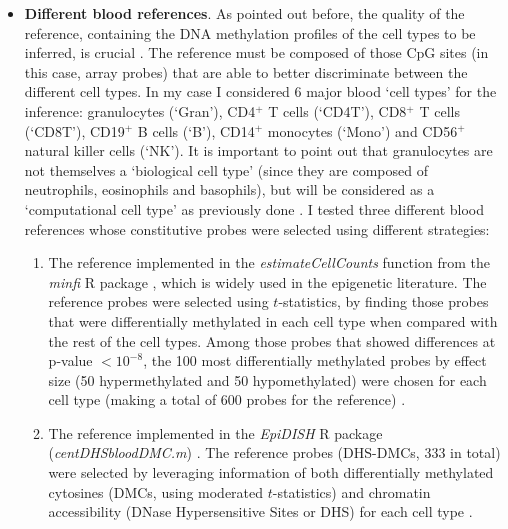 \begin{itemize}
	
	\item \textbf{Different blood references}. As pointed out before, the quality of the reference, containing the DNA methylation profiles of the cell types to be inferred, is crucial \cite{Teschendorff2017a,Koestler2016}. The reference must be composed of those CpG sites (in this case, array probes) that are able to better discriminate between the different cell types. In my case I considered 6 major blood `cell types' for the inference: granulocytes (`\acrshort{Gran}'), CD4$^+$ T cells (`\acrshort{CD4T}'), CD8$^+$ T cells (`\acrshort{CD8T}'), CD19$^+$ B cells (`\acrshort{B}'), CD14$^+$ monocytes (`\acrshort{Mono}') and  CD56$^+$ natural killer cells (`\acrshort{NK}'). It is important to point out that granulocytes are not themselves a `biological cell type' (since they are composed of neutrophils, eosinophils and basophils), but will be considered as a `computational cell type' as previously done \cite{Horvath2016, Chen2016}. I tested three different blood references whose constitutive probes were selected using different strategies:
	
	\begin{enumerate}
		
		\item The reference implemented in the \textit{estimateCellCounts} function from the \textit{minfi} R package \cite{Aryee2014}, which is widely used in the epigenetic literature. The reference probes were selected using $t$-statistics, by finding those probes that were differentially methylated in each cell type when compared with the rest of the cell types. Among those probes that showed differences at p-value $< 10^{-8}$, the 100 most differentially methylated probes by effect size (50 hypermethylated and 50 hypomethylated) were chosen for each cell type (making a total of 600 probes for the reference) \cite{Jaffe2014}. 
		
		\smallskip
		
		\item The reference implemented in the \textit{EpiDISH} R package (\textit{centDHSbloodDMC.m}) \cite{Teschendorff2017b}. The reference probes (\acrshort{DHS-DMCs}, 333 in total) were selected by leveraging information of both differentially methylated cytosines (\acrshort{DMCs}, using moderated $t$-statistics) and chromatin accessibility (DNase Hypersensitive Sites or \acrshort{DHS}) for each cell type \cite{Teschendorff2017a}.  
		

\end{enumerate}
\end{itemize}
